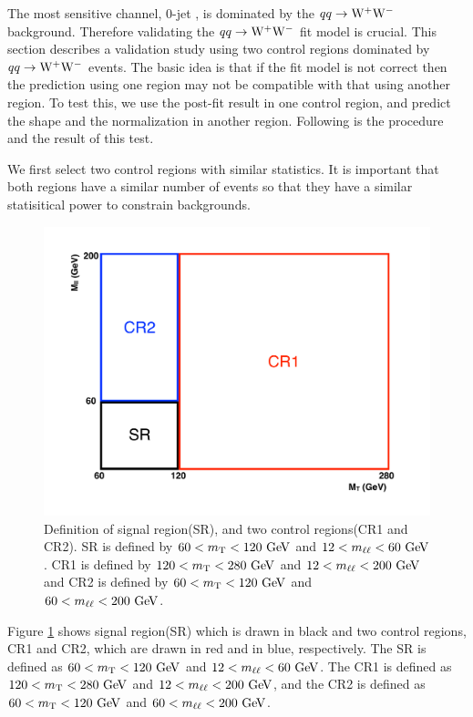 The most sensitive channel, 0-jet \DF, is dominated by the $qq\rightarrow\mathrm{W}^+\mathrm{W}^-$ background. 
Therefore validating the $qq\rightarrow\mathrm{W}^+\mathrm{W}^-$ fit model is crucial. 
This section describes a validation study using two 
control regions dominated by $qq\rightarrow\mathrm{W}^+\mathrm{W}^-$ events.
The basic idea is that if the fit model is not correct then the prediction using 
one region may not be compatible with that using another region. To test this, 
we use the post-fit result in one control region, and predict the shape 
and the normalization in another region. 
Following is the procedure and the result of this test. 

We first select two control regions with similar statistics. It is important that 
both regions have a similar number of events so that they have a similar statisitical 
power to constrain backgrounds. 
%
\begin{figure}[!hbtp]
\centering
\includegraphics[width=.6\textwidth]{figures/WWctl_scheme.pdf}
\caption{Definition of signal region(SR), and two control regions(CR1 and CR2). 
SR is defined by $60<m_{\mathrm{T}}<120~\mathrm{Ge\kern -0.1em V}$ and $12<m_{\ell\ell}<60~\mathrm{Ge\kern -0.1em V}$. 
CR1 is defined by $120<m_{\mathrm{T}}<280~\mathrm{Ge\kern -0.1em V}$ and $12<m_{\ell\ell}<200~\mathrm{Ge\kern -0.1em V}$ and 
CR2 is defined by $60<m_{\mathrm{T}}<120~\mathrm{Ge\kern -0.1em V}$ and $60<m_{\ell\ell}<200~\mathrm{Ge\kern -0.1em V}$. }
\label{fig:WWctlregions}
\end{figure}
Figure \ref{fig:WWctlregions} shows signal region(SR) which is drawn in black 
and two control regions, CR1 and CR2, which are drawn in red and in blue, respectively. 
The SR is defined as $60<m_{\mathrm{T}}<120~\mathrm{Ge\kern -0.1em V}$ and $12<m_{\ell\ell}<60~\mathrm{Ge\kern -0.1em V}$. 
The CR1 is defined as $120<m_{\mathrm{T}}<280~\mathrm{Ge\kern -0.1em V}$ and $12<m_{\ell\ell}<200~\mathrm{Ge\kern -0.1em V}$, 
and the CR2 is defined as $60<m_{\mathrm{T}}<120~\mathrm{Ge\kern -0.1em V}$ and $60<m_{\ell\ell}<200~\mathrm{Ge\kern -0.1em V}$. 
%
